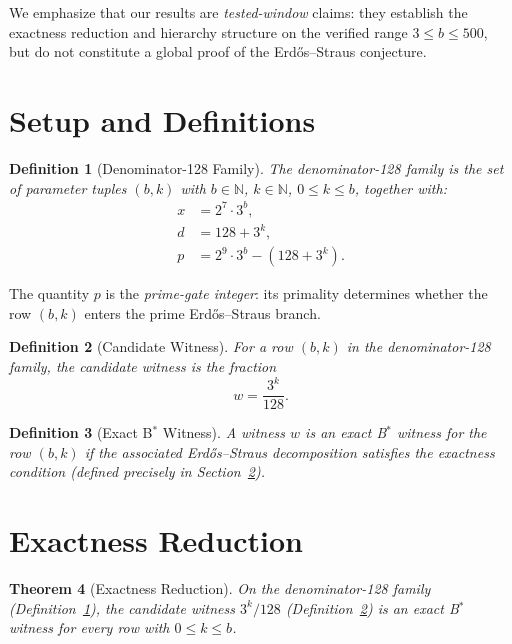\documentclass[11pt,letterpaper]{article}
\newtheorem{theorem}{Theorem}
\newtheorem{definition}[theorem]{Definition}
\begin{document}
We emphasize that our results are \emph{tested-window} claims: they establish the exactness reduction and hierarchy structure on the verified range $3 \leq b \leq 500$, but do not constitute a global proof of the Erd\H{o}s--Straus conjecture.

\section{Setup and Definitions}

\begin{definition}[Denominator-128 Family]\label{def:den128}
The \emph{denominator-128 family} is the set of parameter tuples $(b, k)$ with $b \in \mathbb{N}$, $k \in \mathbb{N}$, $0 \leq k \leq b$, together with:
\begin{align}
    x &= 2^7 \cdot 3^b, \label{eq:x} \\
    d &= 128 + 3^k, \label{eq:d} \\
    p &= 2^9 \cdot 3^b - (128 + 3^k). \label{eq:p}
\end{align}
\end{definition}

The quantity $p$ is the \emph{prime-gate integer}: its primality determines whether the row $(b, k)$ enters the prime Erd\H{o}s--Straus branch.

\begin{definition}[Candidate Witness]\label{def:witness}
For a row $(b, k)$ in the denominator-128 family, the \emph{candidate witness} is the fraction
\begin{equation}
    w = \frac{3^k}{128}.
\end{equation}
\end{definition}

\begin{definition}[Exact B$^\ast$ Witness]\label{def:exact}
A witness $w$ is an \emph{exact B$^\ast$ witness} for the row $(b, k)$ if the associated Erd\H{o}s--Straus decomposition satisfies the exactness condition (defined precisely in Section~\ref{sec:exactness}).
\end{definition}

\section{Exactness Reduction}\label{sec:exactness}

\begin{theorem}[Exactness Reduction]\label{thm:reduction}
On the denominator-128 family (Definition~\ref{def:den128}), the candidate witness $3^k/128$ (Definition~\ref{def:witness}) is an exact B$^\ast$ witness for every row with $0 \leq k \leq b$.
\end{theorem}
\end{document}
